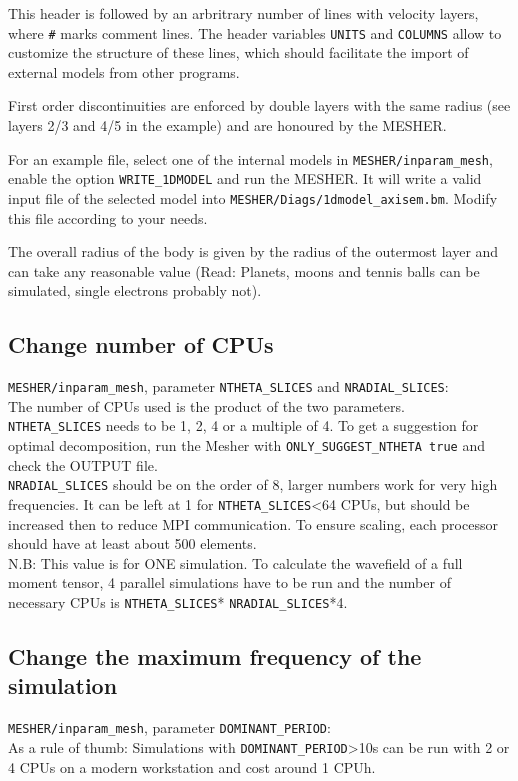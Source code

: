 \documentclass{article}
\begin{document}
This header is followed by an arbritrary number of lines with velocity layers, where \verb|#| marks comment lines. The header variables \verb|UNITS| and \verb|COLUMNS| allow to customize the structure of these lines, which should facilitate the import of external models from other programs.

First order discontinuities are enforced by double layers with the same radius (see layers 2/3 and 4/5
in the example) and are honoured by the MESHER. 

For an example file, select one of the internal models in \verb|MESHER/inparam_mesh|, enable the option \verb|WRITE_1DMODEL| and run the MESHER. It will write a valid input file of the selected model into \verb|MESHER/Diags/1dmodel_axisem.bm|. Modify this file according to your needs.

The overall radius of the body is given by the radius of the outermost layer and can take
any reasonable value (Read: Planets, moons and tennis balls can be simulated, single electrons probably not).

\subsection{Change number of CPUs}

\verb|MESHER/inparam_mesh|, parameter \verb|NTHETA_SLICES| and \verb|NRADIAL_SLICES|: \\
The number of CPUs used is the product of the two parameters. \\
\verb|NTHETA_SLICES| needs to be 1, 2, 4 or a multiple of 4. To get a suggestion for
optimal decomposition, run the Mesher with \verb|ONLY_SUGGEST_NTHETA true| and check the
OUTPUT file.\\
\verb|NRADIAL_SLICES| should be on the order of 8, larger numbers work for very high
frequencies. It can be left at 1 for \verb|NTHETA_SLICES|<64 CPUs, but should be increased
then to reduce MPI communication. To ensure scaling, each processor should have at least
about 500 elements.\\
N.B: This value is for ONE simulation. To calculate the wavefield of a full moment tensor,
4 parallel simulations have to be run and the number of necessary CPUs is
\verb|NTHETA_SLICES|* \verb|NRADIAL_SLICES|*4. 


\subsection{Change the maximum frequency of the simulation}
\verb|MESHER/inparam_mesh|, parameter \verb|DOMINANT_PERIOD|: \\
As a rule of thumb: Simulations with \verb|DOMINANT_PERIOD|>10s can be run with 2 or 4
CPUs on a modern workstation and cost around 1 CPUh.
\end{document}
